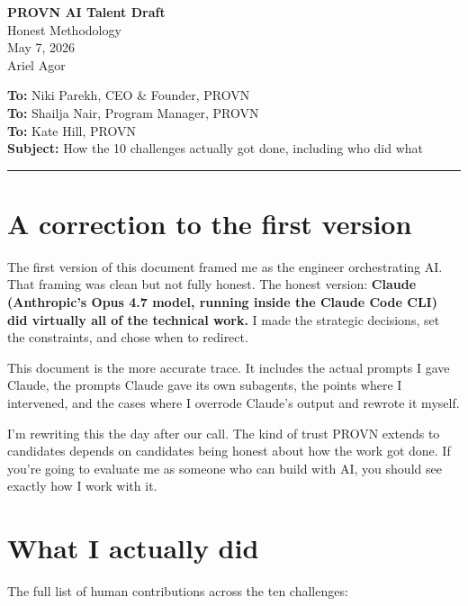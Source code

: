 \documentclass[12pt, letterpaper]{article}
\begin{document}
\begin{center}
{\LARGE\bfseries PROVN AI Talent Draft}\\[6pt]
{\Large Honest Methodology}\\[12pt]
{\normalsize May 7, 2026}\\[4pt]
{\small Ariel Agor}
\end{center}

\vspace{12pt}

\begin{flushleft}
\textbf{To:} Niki Parekh, CEO \& Founder, PROVN\\
\textbf{To:} Shailja Nair, Program Manager, PROVN\\
\textbf{To:} Kate Hill, PROVN\\
\textbf{Subject:} How the 10 challenges actually got done, including who did what
\end{flushleft}

\vspace{12pt}
\hrule
\vspace{18pt}

\section{A correction to the first version}

The first version of this document framed me as the engineer orchestrating AI. That framing was clean but not fully honest. The honest version: \textbf{Claude (Anthropic's Opus 4.7 model, running inside the Claude Code CLI) did virtually all of the technical work.} I made the strategic decisions, set the constraints, and chose when to redirect.

This document is the more accurate trace. It includes the actual prompts I gave Claude, the prompts Claude gave its own subagents, the points where I intervened, and the cases where I overrode Claude's output and rewrote it myself.

I'm rewriting this the day after our call. The kind of trust PROVN extends to candidates depends on candidates being honest about how the work got done. If you're going to evaluate me as someone who can build with AI, you should see exactly how I work with it.

\section{What I actually did}

The full list of human contributions across the ten challenges:
\end{document}
